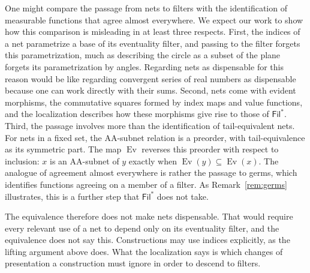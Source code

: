 \documentclass[11pt,a4paper]{article}
\theoremstyle{definition}
\theoremstyle{remark}
\newcommand{\Filp}{\mathsf{Fil}^{*}}
\newcommand{\Ev}{\operatorname{Ev}}
\begin{document}
One might compare the passage from nets to filters with the
identification of measurable functions that agree almost everywhere.
We expect our work to show how this comparison is misleading in at
least three respects. First, the indices of
a net parametrize a base of its eventuality filter, and passing to the
filter forgets this parametrization, much as describing the circle as
a subset of the plane forgets its parametrization by angles. Regarding
nets as dispensable for this reason would be like regarding convergent
series of real numbers as dispensable because one can work directly
with their sums. Second, nets come with evident morphisms, the
commutative squares formed by index maps and value functions, and the
localization describes how these morphisms give rise to those of
\(\Filp\). Third, the passage involves more than the identification
of tail-equivalent nets. For nets in a fixed set, the AA-subnet
relation is a preorder, with tail-equivalence as its symmetric part.
The map \(\Ev\) reverses this preorder with respect to inclusion:
\(x\) is an AA-subnet of \(y\) exactly when
\(\Ev(y)\subseteq\Ev(x)\). The analogue
of agreement almost everywhere is rather the passage to germs, which
identifies functions agreeing on a member of a filter. As
Remark~\ref{rem:germs} illustrates, this is a further step that
\(\Filp\) does not take.

The equivalence therefore does not make nets dispensable. That would
require every relevant use of a net to depend only on its eventuality
filter, and the equivalence does not say this. Constructions may use
indices explicitly, as the lifting argument above does. What the
localization says is which changes of presentation a construction
must ignore in order to descend to filters.
\end{document}
